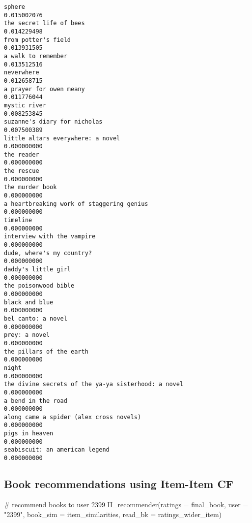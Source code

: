 \documentclass[
]{report}
\newenvironment{Shaded}{\begin{snugshade}}{\end{snugshade}}
\newcommand{\AttributeTok}[1]{\textcolor[rgb]{0.40,0.45,0.13}{#1}}
\newcommand{\CommentTok}[1]{\textcolor[rgb]{0.37,0.37,0.37}{#1}}
\newcommand{\FunctionTok}[1]{\textcolor[rgb]{0.28,0.35,0.67}{#1}}
\newcommand{\NormalTok}[1]{\textcolor[rgb]{0.00,0.23,0.31}{#1}}
\newcommand{\StringTok}[1]{\textcolor[rgb]{0.13,0.47,0.30}{#1}}
\begin{document}
\begin{verbatim}
sphere                                                      0.015002076
the secret life of bees                                     0.014229498
from potter's field                                         0.013931505
a walk to remember                                          0.013512516
neverwhere                                                  0.012658715
a prayer for owen meany                                     0.011776044
mystic river                                                0.008253845
suzanne's diary for nicholas                                0.007500389
little altars everywhere: a novel                           0.000000000
the reader                                                  0.000000000
the rescue                                                  0.000000000
the murder book                                             0.000000000
a heartbreaking work of staggering genius                   0.000000000
timeline                                                    0.000000000
interview with the vampire                                  0.000000000
dude, where's my country?                                   0.000000000
daddy's little girl                                         0.000000000
the poisonwood bible                                        0.000000000
black and blue                                              0.000000000
bel canto: a novel                                          0.000000000
prey: a novel                                               0.000000000
the pillars of the earth                                    0.000000000
night                                                       0.000000000
the divine secrets of the ya-ya sisterhood: a novel         0.000000000
a bend in the road                                          0.000000000
along came a spider (alex cross novels)                     0.000000000
pigs in heaven                                              0.000000000
seabiscuit: an american legend                              0.000000000
\end{verbatim}

\subsection{Book recommendations using Item-Item
CF}\label{book-recommendations-using-item-item-cf}

\begin{Shaded}
\begin{Highlighting}[]
\CommentTok{\# recommend books to user 2399}
\FunctionTok{II\_recommender}\NormalTok{(}\AttributeTok{ratings =}\NormalTok{ final\_book,}
                           \AttributeTok{user =} \StringTok{"2399"}\NormalTok{, }
                           \AttributeTok{book\_sim =}\NormalTok{ item\_similarities, }
                           \AttributeTok{read\_bk =}\NormalTok{ ratings\_wider\_item)}
\end{Highlighting}
\end{Shaded}
\end{document}

